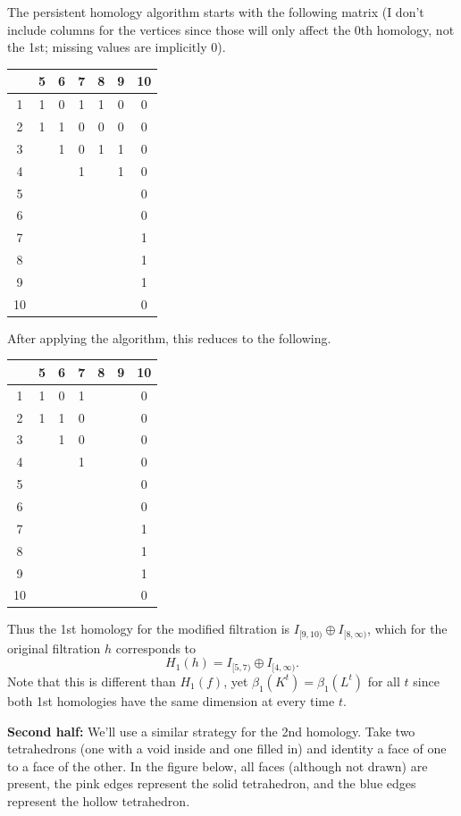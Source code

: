 \documentclass[twoside,10pt]{article}
\begin{document}
The persistent homology algorithm starts with the following matrix (I don't include columns for the vertices since those will only affect the 0th homology, not the 1st; missing values are implicitly 0).
\begin{center}
	\begin{tabular}{c|c c c c c c}
		& 5&6&7&8&9&10 \\
		\hline
		1& 1&0&1&1&0&0\\
		2& 1&1&0&0&0&0\\
		3& &1&0&1&1&0\\
		4& &&1&&1&0\\
		5& &&&&&0\\
		6& &&&&&0\\
		7& &&&&&1\\
		8& &&&&&1\\
		9& &&&&&1\\
		10& &&&&&0
	\end{tabular}
\end{center}
After applying the algorithm, this reduces to the following.
\begin{center}
        \begin{tabular}{c|c c c c c c}
                & 5&6&7&8&9&10 \\
                \hline
                1& 1&0&1&&&0\\
                2& 1&1&0&&&0\\
                3& &1&0&&&0\\
                4& &&1&&&0\\
                5& &&&&&0\\
                6& &&&&&0\\
                7& &&&&&1\\
                8& &&&&&1\\
                9& &&&&&1\\
                10& &&&&&0
        \end{tabular}
\end{center}
Thus the 1st homology for the modified filtration is $I_{[9,10)}\oplus I_{[8,\infty)}$, which for the original filtration $h$ corresponds to
\[
	H_1(h) = I_{[5,7)}\oplus I_{[4,\infty)}.
\] Note that this is different than $H_{1}(f)$, yet $\beta_1(K^{t}) = \beta_1(L^{t})$ for all $t$ since both 1st homologies have the same dimension at every time $t$.


\textbf{Second half:} We'll use a similar strategy for the 2nd homology. Take two tetrahedrons (one with a void inside and one filled in) and identity a face of one to a face of the other. In the figure below, all faces (although not drawn) are present, the pink edges represent the solid tetrahedron, and the blue edges represent the hollow tetrahedron.
\end{document}

